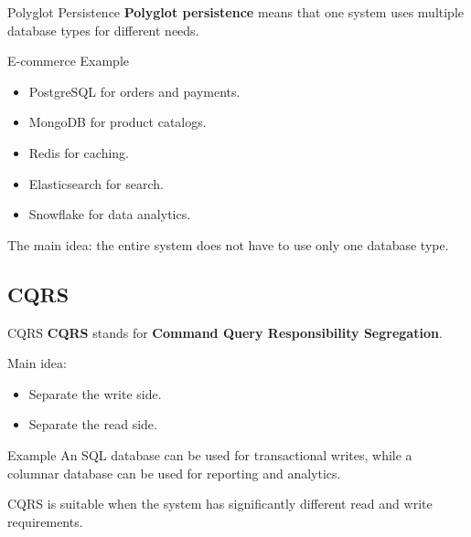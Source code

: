 \documentclass[aspectratio=169,11pt]{beamer}
\newcommand{\keyword}[1]{\textcolor{accent}{\textbf{#1}}}
\newcommand{\kw}[1]{\keyword{#1}}
\newcommand{\smallitem}{\setlength{\itemsep}{2pt}\setlength{\parskip}{0pt}}
\begin{document}
\begin{frame}{Polyglot Persistence}
\kw{Polyglot persistence} means that one system uses multiple database types for different needs.

\begin{exampleblock}{E-commerce Example}
\begin{itemize}
  \smallitem
  \item PostgreSQL for orders and payments.
  \item MongoDB for product catalogs.
  \item Redis for caching.
  \item Elasticsearch for search.
  \item Snowflake for data analytics.
\end{itemize}
\end{exampleblock}

The main idea: the entire system does not have to use only one database type.
\end{frame}

\subsection{CQRS}
\begin{frame}{CQRS}
\kw{CQRS} stands for \kw{Command Query Responsibility Segregation}.

\vspace{2mm}
Main idea:
\begin{itemize}
  \smallitem
  \item Separate the write side.
  \item Separate the read side.
\end{itemize}

\begin{exampleblock}{Example}
An SQL database can be used for transactional writes, while a columnar database can be used for reporting and analytics.
\end{exampleblock}

CQRS is suitable when the system has significantly different read and write requirements.
\end{frame}
\end{document}
